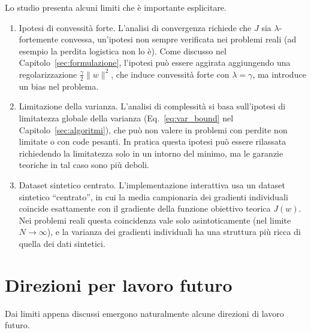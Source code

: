 \documentclass[italian, a4paper, twoside, binding=6mm]{sapthesis}
\begin{document}
Lo studio presenta alcuni limiti che è importante esplicitare.

\begin{enumerate}
  \item Ipotesi di convessità forte. L'analisi di convergenza richiede
  che $J$ sia $\lambda$-fortemente convessa, un'ipotesi non sempre verificata
  nei problemi reali (ad esempio la perdita logistica non lo è). Come discusso
  nel Capitolo~\ref{sec:formulazione}, l'ipotesi può essere aggirata
  aggiungendo una regolarizzazione $\frac{\gamma}{2}\|w\|^2$, che induce
  convessità forte con $\lambda = \gamma$, ma introduce un bias nel problema.
  \item Limitazione della varianza. L'analisi di complessità si basa
  sull'ipotesi di limitatezza globale della varianza
  (Eq.~\eqref{eq:var_bound} nel Capitolo~\ref{sec:algoritmi}), che può non
  valere in problemi con perdite non limitate o con code pesanti. In pratica
  questa ipotesi può essere rilassata richiedendo la limitatezza solo in un
  intorno del minimo, ma le garanzie teoriche in tal caso sono più deboli.
  \item Dataset sintetico centrato. L'implementazione interattiva usa
  un dataset sintetico ``centrato'', in cui la media campionaria dei gradienti
  individuali coincide esattamente con il gradiente della funzione
  obiettivo teorica $J(w)$. Nei problemi reali questa coincidenza vale solo
  asintoticamente (nel limite $N \to \infty$), e la varianza dei gradienti
  individuali ha una struttura più ricca di quella dei dati sintetici.
\end{enumerate}

\section{Direzioni per lavoro futuro}

Dai limiti appena discussi emergono naturalmente alcune direzioni di lavoro
futuro.
\end{document}
